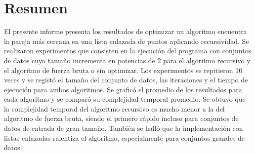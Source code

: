 \section{Resumen}
El presente informe presenta los resultados de optimizar un algoritmo encuentra la pareja más cercana en una lista enlazada de puntos aplicando recursividad. Se realizaron experimentos que consisten en la ejecución del programa con conjuntos de datos cuyo tamaño incrementa en potencias de 2 para el algoritmo recursivo y el algoritmo de fuerza bruta o sin optimizar. Los experimentos se repitieron 10 veces y se registó el tamaño del conjunto de datos, las iteraciones y el tiempo de ejecución para ambos algoritmos. Se graficó el promedio de los resultados para cada algoritmo y se comparó su complejidad temporal promedio. Se obtuvo que la complejidad temporal del algoritmo recursivo es mucho menor a la del algoritmo de fuerza bruta, siendo el primero rápido incluso para conjuntos de datos de entrada de gran tamaño. También se halló que la implementación con listas enlazadas ralentiza el algoritmo, especialmente para conjuntos grandes de datos.